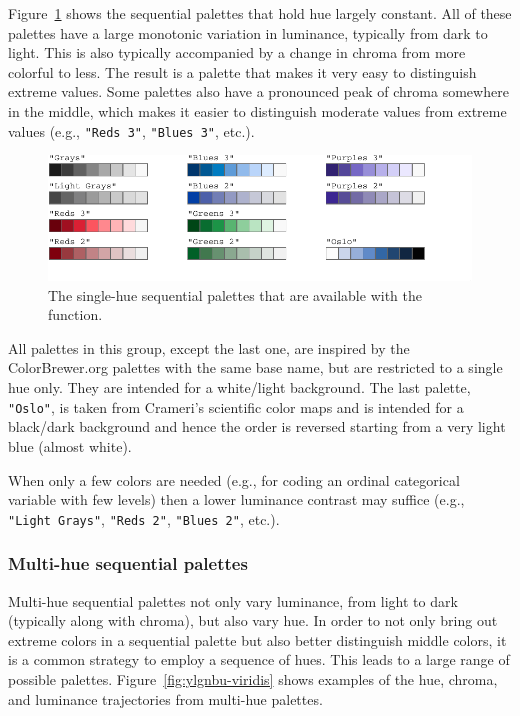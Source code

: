 Figure~\ref{fig:singleSeqPalettes} shows the sequential palettes that
hold hue largely constant. All of these palettes have a large
monotonic variation in luminance, typically from dark to light. This
is also typically accompanied by a change in chroma from more
colorful to less. The result is a palette that makes it very easy to
distinguish extreme values. Some palettes also have a pronounced peak
of chroma somewhere in the middle, which makes it easier to
distinguish moderate values from extreme values (e.g.,
\texttt{"Reds\ 3"}, \texttt{"Blues\ 3"}, etc.).

\begin{figure}[ht!]

{\centering \includegraphics[width=1\linewidth]{color_files/figure-latex/singleSeqPalettes-1} 

}

\caption{The single-hue sequential palettes that are available with the  function.}\label{fig:singleSeqPalettes}
\end{figure}

All palettes in this group,
except the last one, are inspired by the ColorBrewer.org palettes with
the same base name, but are restricted to a
single hue only. They are intended for a white/light background. The
last palette, \texttt{"Oslo"}, is taken from Crameri's scientific color maps
and is intended for a black/dark background and hence the order
is reversed starting from a very light blue (almost white).

When only a few colors
are needed (e.g., for coding an ordinal categorical variable with few
levels) then a lower luminance contrast may suffice
(e.g., \texttt{"Light\ Grays"}, \texttt{"Reds\ 2"}, \texttt{"Blues\ 2"}, etc.).

\hypertarget{multi-hue-sequential-palettes}{%
\subsubsection{Multi-hue sequential palettes}\label{multi-hue-sequential-palettes}}

Multi-hue
sequential palettes not only vary luminance, from light to dark
(typically along with chroma), but also vary hue.
In order to not only bring out extreme colors in a sequential palette but also
better distinguish middle colors, it is a common strategy to employ a
sequence of hues. This leads to a large range of possible palettes.
Figure~\ref{fig:ylgnbu-viridis} shows examples of the
hue, chroma, and luminance trajectories from multi-hue palettes.


